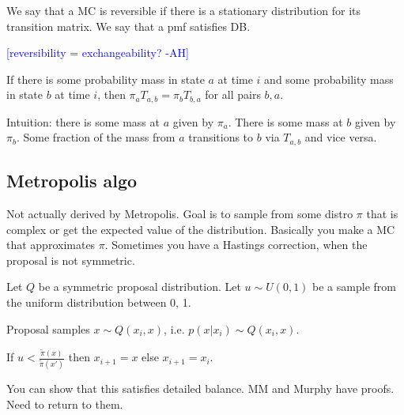 \documentclass[12pt]{amsart}
\newcommand{\ahcomment}[1]{\textcolor{blue}{[#1 -AH]}}
\begin{document}
We say that a MC is reversible if there is a stationary distribution for its transition matrix. We say that a pmf satisfies DB. 

\ahcomment{reversibility = exchangeability?}

If there is some probability mass in state $a$ at time $i$ and some probability mass in state $b$ at time $i$, then $\pi_a T_{a,b} = \pi_b T_{b,a}$ for all pairs $b,a$.

Intuition: there is some mass at $a$ given by $\pi_a$. There is some mass at $b$ given by $\pi_b$. Some fraction of the mass from $a$ transitions to $b$ via $T_{a,b}$ and vice versa. 

\subsection{Metropolis algo}
Not actually derived by Metropolis. Goal is to sample from some distro $\pi$ that is complex or get the expected value of the distribution. Basically you make a MC that approximates $\pi$. Sometimes you have a Hastings correction, when the proposal is not symmetric. 

Let $Q$ be a symmetric proposal distribution. Let $u \sim U(0,1)$ be a sample from the uniform distribution between 0, 1.

Proposal samples $x \sim Q(x_i, x)$, i.e. $p(x | x_i) \sim Q(x_i, x)$. 

If $u < \frac{\widetilde{\pi}(x)}{\widetilde{\pi}(x')}$ then $x_{i+1} = x$ else $x_{i+ 1} = x_i$.

You can show that this satisfies detailed balance. MM and Murphy have proofs. Need to return to them.
\end{document}
